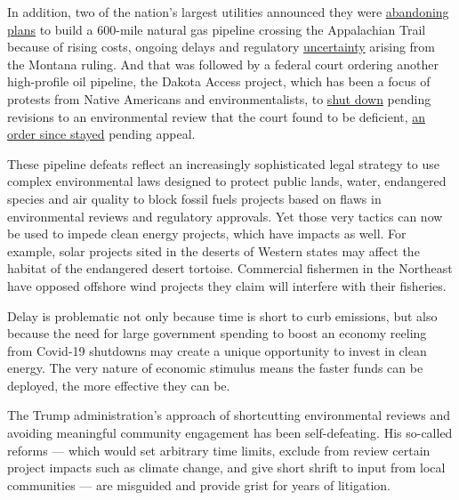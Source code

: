 In addition, two of the nation's largest utilities announced they were
\href{https://www.nytimes3xbfgragh.onion/2020/07/05/business/atlantic-coast-pipeline-cancel-dominion-energy-berkshire-hathaway.html}{abandoning
plans} to build a 600-mile natural gas pipeline crossing the Appalachian
Trail because of rising costs, ongoing delays and regulatory
\href{https://news.dominionenergy.com/2020-07-05-Dominion-Energy-and-Duke-Energy-Cancel-the-Atlantic-Coast-Pipeline}{uncertainty}
arising from the Montana ruling. And that was followed by a federal
court ordering another high-profile oil pipeline, the Dakota Access
project, which has been a focus of protests from Native Americans and
environmentalists, to
\href{https://www.nytimes3xbfgragh.onion/aponline/2020/07/06/business/ap-us-dakota-access-pipeline.html}{shut
down} pending revisions to an environmental review that the court found
to be deficient,
\href{https://www.marketwatch.com/story/federal-appeals-court-temporarily-halts-dakota-access-pipeline-shutdown-2020-07-14}{an
order since stayed} pending appeal.

These pipeline defeats reflect an increasingly sophisticated legal
strategy to use complex environmental laws designed to protect public
lands, water, endangered species and air quality to block fossil fuels
projects based on flaws in environmental reviews and regulatory
approvals. Yet those very tactics can now be used to impede clean energy
projects, which have impacts as well. For example, solar projects sited
in the deserts of Western states may affect the habitat of the
endangered desert tortoise. Commercial fishermen in the Northeast have
opposed offshore wind projects they claim will interfere with their
fisheries.

Delay is problematic not only because time is short to curb emissions,
but also because the need for large government spending to boost an
economy reeling from Covid-19 shutdowns may create a unique opportunity
to invest in clean energy. The very nature of economic stimulus means
the faster funds can be deployed, the more effective they can be.

The Trump administration's approach of shortcutting environmental
reviews and avoiding meaningful community engagement has been
self-defeating. His so-called reforms --- which would set arbitrary time
limits, exclude from review certain project impacts such as climate
change, and give short shrift to input from local communities --- are
misguided and provide grist for years of litigation.

